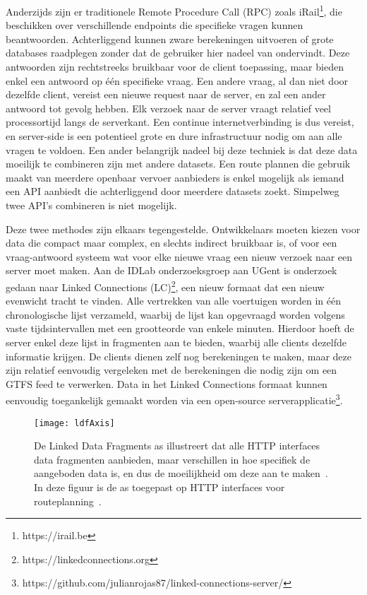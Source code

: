 Anderzijds zijn er traditionele Remote Procedure Call (RPC) zoals iRail\footnote{https://irail.be}, die beschikken over verschillende endpoints die specifieke vragen kunnen beantwoorden. Achterliggend kunnen zware berekeningen uitvoeren of grote databases raadplegen zonder dat de gebruiker hier nadeel van ondervindt. Deze antwoorden zijn rechtstreeks bruikbaar voor de client toepassing, maar bieden enkel een antwoord op één specifieke vraag. Een andere vraag, al dan niet door dezelfde client, vereist een nieuwe request naar de server, en zal een ander antwoord tot gevolg hebben. Elk verzoek naar de server vraagt relatief veel processortijd langs de serverkant. Een continue internetverbinding is dus vereist, en server-side is een potentieel grote en dure infrastructuur nodig om aan alle vragen te voldoen. Een ander belangrijk nadeel bij deze techniek is dat deze data moeilijk te combineren zijn met andere datasets. Een route plannen die gebruik maakt van meerdere openbaar vervoer aanbieders is enkel mogelijk als iemand een API aanbiedt die achterliggend door meerdere datasets zoekt. Simpelweg twee API's combineren is niet mogelijk.

Deze twee methodes zijn elkaars tegengestelde. Ontwikkelaars moeten kiezen voor data die compact maar complex, en slechts indirect bruikbaar is, of voor een vraag-antwoord systeem wat voor elke nieuwe vraag een nieuw verzoek naar een server moet maken. Aan de IDLab onderzoeksgroep aan UGent is onderzoek gedaan naar Linked Connections (LC)\footnote{https://linkedconnections.org}, een nieuw formaat dat een nieuw evenwicht tracht te vinden. Alle vertrekken van alle voertuigen worden in één chronologische lijst verzameld, waarbij de lijst kan opgevraagd worden volgens vaste tijdsintervallen met een grootteorde van enkele minuten. Hierdoor hoeft de server enkel deze lijst in fragmenten aan te bieden, waarbij alle clients dezelfde informatie krijgen. De clients dienen zelf nog berekeningen te maken, maar deze zijn relatief eenvoudig vergeleken met de berekeningen die nodig zijn om een GTFS feed te verwerken. Data in het Linked Connections formaat kunnen eenvoudig toegankelijk gemaakt worden via een open-source serverapplicatie\footnote{https://github.com/julianrojas87/linked-connections-server/}.

\begin{figure}
	\centering
		\texttt{[image: ldfAxis]}
	\caption[Routeplanning HTTP interfaces op de LDF as]{De Linked Data Fragments as illustreert dat alle HTTP interfaces data fragmenten aanbieden, maar verschillen in hoe specifiek de aangeboden data is, en dus de moeilijkheid om deze aan te maken~\citep{verborgh14}. In deze figuur is de as toegepast op HTTP interfaces voor routeplanning~\citep{colpaert15}.}
	\label{fig:ldfAxis}
\end{figure}

